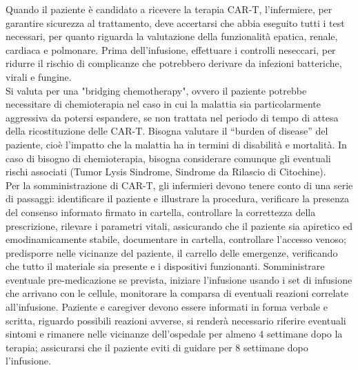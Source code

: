 Quando il paziente è candidato a ricevere la terapia CAR-T, l’infermiere, per garantire sicurezza al trattamento, 
deve accertarsi che abbia eseguito tutti i test necessari, per quanto riguarda la valutazione della funzionalità epatica, 
renale, cardiaca e polmonare\cite{article2}. Prima dell’infusione, effettuare i controlli neseccari, per ridurre il 
rischio di complicanze che potrebbero derivare da infezioni batteriche, virali e fungine\cite{NURSINGCART}.\\
Si valuta per una "bridging chemotherapy", ovvero il paziente potrebbe necessitare di chemioterapia nel caso in cui 
la malattia sia particolarmente aggressiva da potersi espandere, se non trattata nel periodo di tempo di attesa della 
ricostituzione delle CAR-T. Bisogna valutare il “burden of disease” del paziente, cioè l’impatto che 
la malattia ha in termini di disabilità e mortalità. 
In caso di bisogno di chemioterapia, bisogna considerare comunque gli eventuali rischi associati 
(Tumor Lysis Sindrome, Sindrome da Rilascio di Citochine)\cite{article3}.\\

Per la somministrazione di CAR-T, gli infermieri devono tenere conto di una serie di passaggi: identificare il paziente e 
illustrare la procedura, verificare la presenza del consenso informato firmato in cartella, controllare la correttezza 
della prescrizione, rilevare i parametri vitali, assicurando che il paziente sia apiretico ed emodinamicamente stabile, 
documentare in cartella, controllare l’accesso venoso; predisporre nelle vicinanze del paziente, il carrello delle 
emergenze, verificando che tutto il materiale sia presente e i dispositivi funzionanti\cite{NURSINGCART}. 
Somministrare eventuale pre-medicazione se prevista, iniziare l’infusione usando i set di infusione che arrivano con 
le cellule, monitorare la comparsa di eventuali reazioni correlate all’infusione. 
Paziente e caregiver devono essere informati in forma verbale e scritta, riguardo possibili reazioni avverse, 
si renderà necessario riferire eventuali sintomi e rimanere nelle vicinanze dell’ospedale per almeno 4 settimane dopo 
la terapia; assicurarsi che il paziente eviti di guidare per 8 settimane dopo l’infusione\cite{NURSINGCART}.\\


